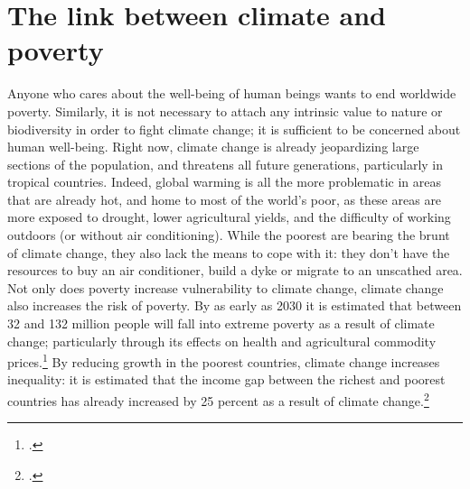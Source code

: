 \documentclass[a5paper,english,openany]{memoir}
\begin{document}
\section*{The link between climate and poverty} 

Anyone who cares about the well-being of human beings wants to end worldwide poverty. %
Similarly, it is not necessary to attach any intrinsic value to nature %
or biodiversity in order to fight climate change; it is sufficient to be concerned about human well-being. Right now, climate change is already jeopardizing %
large sections of the population, and threatens all future generations, %
particularly in tropical countries. Indeed, global warming is all the more problematic in areas that are already hot, %
and home to most of the world's poor, %
as these areas are more exposed to drought, lower agricultural yields, and the difficulty of working outdoors (or without air conditioning). While the poorest are bearing the brunt of climate change, they also lack the means to cope with it: %
they don't have the resources to buy an air conditioner, build a dyke or migrate to an unscathed area. Not only does poverty increase vulnerability to climate change, climate change also increases the risk of poverty. By as early as 2030 it is estimated that between 32 and 132 million people will fall into extreme poverty as a result of climate change; particularly through its effects on health and agricultural commodity prices.\footnote{\citet{jafino_revised_2020}.}
 By reducing growth in the poorest countries, climate change increases inequality: it is estimated that the income gap between the richest and poorest countries has already increased by 25 percent as a result of climate change.\footnote{\cite{diffenbaugh_global_2019,khalfan_climate_2023}.} %
\end{document}
